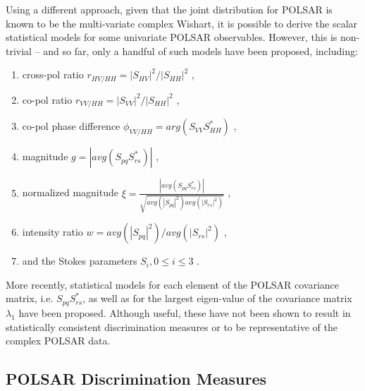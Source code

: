 \documentclass[printer]{tRSL2e}
\begin{document}
Using a different approach, given that the joint distribution for POLSAR is known to be the multi-variate complex Wishart,
  it is possible to derive the scalar statistical models for some univariate POLSAR observables.
However, this is non-trivial -- and so far, only a handful of such models have been proposed, including:
  \begin{enumerate}
  \item cross-pol ratio $r_{HV/HH} = |S_{HV}|^2/|S_{HH}|^2$ \citep{Joughin_1994_TGRS_562},
  \item co-pol ratio $r_{VV/HH} = |S_{VV}|^2/|S_{HH}|^2$ \citep{Joughin_1994_TGRS_562},
  \item co-pol phase difference $\phi_{VV/HH} = arg(S_{VV}S_{HH}^*) $ \citep{Joughin_1994_TGRS_562} \citep{Lee_1994_TGRS_1017},
  \item magnitude $g=|avg(S_{pq}S_{rs}^*)|$ \citep{Lee_1994_TGRS_1017},
  \item normalized magnitude $\xi = \frac{|avg(S_{pq}S_{rs}^*)|}{\sqrt{avg(|S_{pq}|^2) avg(|S_{rs}|^2)}}$ \citep{Lee_1994_TGRS_1017},
  \item intensity ratio $w = avg(|S_{pq}|^2)/avg(|S_{rs}|^2)$ \citep{Lee_1994_TGRS_1017},
  \item and the Stokes parameters $S_i,0 \leq i \leq 3$ \citep{Touzi_1996_TGRS_519}. 
  \end{enumerate}
More recently, statistical models for
  each element of the POLSAR covariance matrix, i.e. $S_{pq}S_{rs}^*$, \citep{Lopez-Martinez_2003_TGRS_2232}
  as well as for the largest eigen-value of the covariance matrix $\lambda_1$ \citep{Erten_2012_Sensors_2766} have been proposed. Although useful, these have not been shown to result in statistically consistent discrimination measures or 
 to be representative of the complex POLSAR data.

\subsection{POLSAR Discrimination Measures}
\label{sec:lit_measures}
\end{document}
